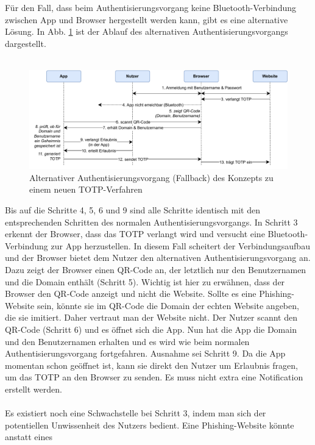 Für den Fall, dass beim Authentisierungsvorgang keine Bluetooth-Verbindung 
zwischen App und Browser hergestellt werden kann, gibt es eine alternative 
Lösung. In Abb. \ref{fig: konzept fallback} ist der Ablauf des alternativen 
Authentisierungsvorgangs dargestellt.
\\\\
\begin{figure}
    \centering
    \includegraphics[width=1\linewidth]{figures/konzept_login_fallback.pdf}
    \caption[Fallback des Konzepts zu einem neuen TOTP-Verfahren]{Alternativer Authentisierungsvorgang (Fallback) des Konzepts zu einem neuen TOTP-Verfahren}
    \label{fig: konzept fallback}
\end{figure}
Bis auf die Schritte 4, 5, 6 und 9 sind alle Schritte identisch mit den 
entsprechenden Schritten des normalen Authentisierungsvorgangs. In Schritt 3 
erkennt der Browser, dass das TOTP verlangt wird und versucht eine 
Bluetooth-Verbindung zur App herzustellen. In diesem Fall scheitert der 
Verbindungsaufbau und der Browser bietet dem Nutzer den alternativen 
Authentisierungsvorgang an. Dazu zeigt der Browser einen QR-Code an, der 
letztlich nur den Benutzernamen und die Domain enthält (Schritt 5). Wichtig ist 
hier zu erwähnen, dass der Browser den QR-Code anzeigt und nicht die Website. 
Sollte es eine Phishing-Website sein, könnte sie im QR-Code die Domain der echten 
Website angeben, die sie imitiert. Daher vertraut man der Website nicht. Der Nutzer 
scannt den QR-Code (Schritt 6) und es öffnet sich die App. Nun hat die App die 
Domain und den Benutzernamen erhalten und es wird wie beim normalen 
Authentisierungsvorgang fortgefahren. Ausnahme sei Schritt 9. Da die App momentan 
schon geöffnet ist, kann sie direkt den Nutzer um Erlaubnis fragen, um das TOTP 
an den Browser zu senden. Es muss nicht extra eine Notification erstellt werden. 
\\\\
Es existiert noch eine Schwachstelle bei Schritt 3, indem man sich der potentiellen 
Unwissenheit des Nutzers bedient. Eine Phishing-Website könnte anstatt eines 

